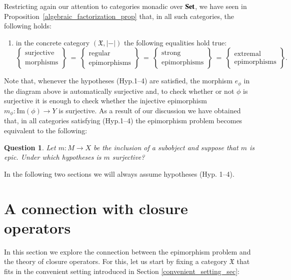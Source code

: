 \documentclass[12pt]{article}
\newtheorem{question}[lemma]{Question}
\theoremstyle{definition}
\def\X{\mathfrak X}
\def\Im{\mathrm{Im}}
\newcommand{\Set}{\textbf{\textup{Set}}}
\renewcommand{\Top}{\textbf{\textup{Top}}}
\numberwithin{equation}{section}
\begin{document}
Restricting again our attention to categories monadic over $\Set$, we have seen in Proposition~\ref{algebraic_factorization_prop} that, in all such categories, the following holds:
\begin{enumerate}[\rm ({Hyp.}4)]
\item in the concrete category $(\X,|-|)$ the following equalities hold true:
\[
\left\{ \begin{matrix}\text{surjective}\\\text{morphisms}\end{matrix}\right\}\ \overset{}=\ \left\{ \begin{matrix}\text{regular}\\\text{epimorphisms}\end{matrix}\right\}\ \overset{}=\ \left\{ \begin{matrix}\text{strong}\\\text{epimorphisms}\end{matrix}\right\}\ \overset{}=\ \left\{ \begin{matrix}\text{extremal}\\\text{epimorphisms}\end{matrix}\right\}.
\]
\end{enumerate}

Note that, whenever the hypotheses (Hyp.1--4) are satisfied, the morphism $e_\phi$ in the diagram above is automatically surjective and, to check whether or not $\phi$ is surjective it is enough to check whether the injective epimorphism $m_\phi\colon \Im(\phi)\to Y$ is surjective. As a result of our discussion we have obtained that, in all categories satisfying (Hyp.1--4) the epimorphism problem becomes equivalent to the following:

\begin{question}
Let $m\colon M\to X$ be the inclusion of a subobject and suppose that $m$ is epic. Under which hypotheses is $m$ surjective?
\end{question}

In the following two sections we will always assume hypotheses (Hyp. 1--4).

\section{A connection with closure operators}
%
%
In this section we explore the connection between the epimorphism problem and the theory of closure operators. For this, let us start by fixing a category $\X$ that fits in the convenient setting introduced in Section \ref{convenient_setting_sec}:
\end{document}
